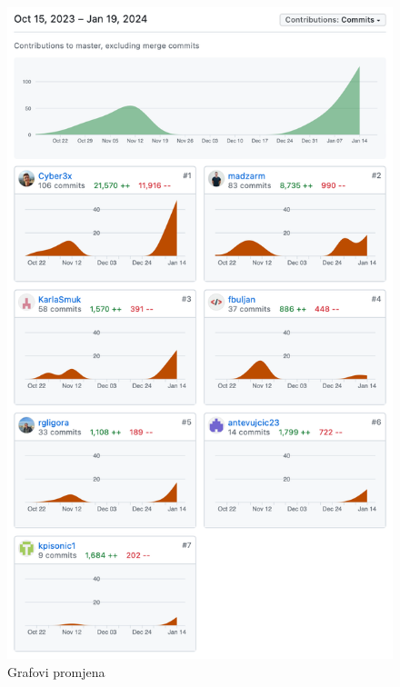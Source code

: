 		\begin{figure}[H]
			\includegraphics[scale=0.7]{slike/commits.png}
			\centering
			\caption{Grafovi promjena}
			\label{fig:commits}
		\end{figure}
		
		
	